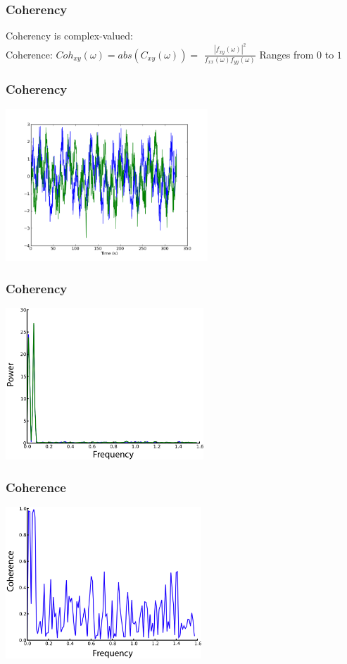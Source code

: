 \documentclass{beamer}
\begin{document}
\begin{frame}
\frametitle{Coherency}
Coherency is complex-valued:
\\
\pause
\vfill
Coherence: $Coh_{xy} (\omega) = abs(C_{xy}(\omega)) = $
\pause
$\frac{|f_{xy}(\omega)|^2}{f_{xx}(\omega)f_{yy}(\omega)}$
\vfill
\pause
Ranges from $0$ to $1$
\end{frame}

\begin{frame}
\frametitle{Coherency}
\includegraphics[height=5.7cm]{figures/outa_phase_tseries}
\end{frame}

\begin{frame}
\frametitle{Coherency}
\includegraphics[height=5.7cm]{figures/outa_phase_tseries_psd}
\end{frame}

\begin{frame}
\frametitle{Coherence}
\includegraphics[height=5.7cm]{figures/outa_phase_tseries_coh}
\end{frame}
\end{document}
